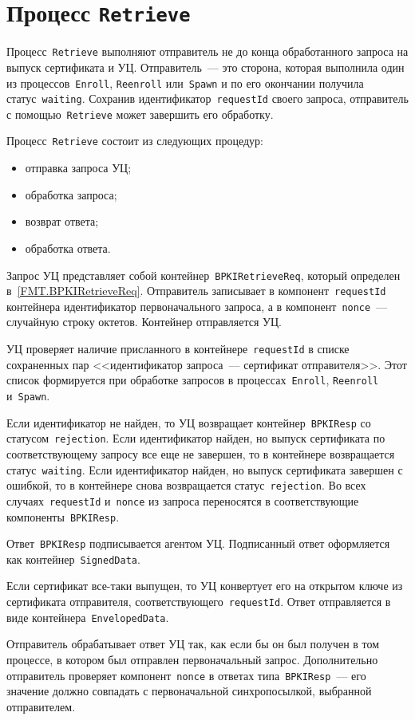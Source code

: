 \section{Процесс \texttt{Retrieve}}\label{PROCESSES.Retrieve}

Процесс~\texttt{Retrieve} выполняют отправитель не до конца обработанного
запроса на выпуск сертификата и УЦ.  Отправитель~--- это сторона, которая 
выполнила один из процессов~\texttt{Enroll}, \texttt{Reenroll} 
или~\texttt{Spawn} и по его окончании получила статус~\texttt{waiting}. 
Сохранив идентификатор~\texttt{requestId} своего запроса, отправитель с 
помощью~\texttt{Retrieve} может завершить его обработку.

Процесс~\texttt{Retrieve} состоит из следующих процедур:
\begin{itemize}
\item
отправка запроса УЦ;
\item
обработка запроса;
\item
возврат ответа;
\item
обработка ответа.
\end{itemize}

Запрос УЦ представляет собой контейнер~\texttt{BPKIRetrieveReq},
который определен в~\ref{FMT.BPKIRetrieveReq}.
Отправитель записывает в компонент~\texttt{requestId} контейнера
идентификатор первоначального запроса, а в компонент~\texttt{nonce}~---
случайную строку октетов. Контейнер отправляется УЦ.

УЦ проверяет наличие присланного в контейнере~\texttt{requestId} в списке 
сохраненных пар <<идентификатор запроса~--- сертификат отправителя>>. Этот 
список формируется при обработке запросов в процессах~\texttt{Enroll}, 
\texttt{Reenroll} и~\texttt{Spawn}. 

Если идентификатор не найден, то УЦ возвращает контейнер~\texttt{BPKIResp}
со статусом~\texttt{rejection}. 
%
Если идентификатор найден, но выпуск сертификата по соответствующему 
запросу все еще не завершен, то в контейнере возвращается 
статус~\texttt{waiting}.  
%
Если идентификатор найден, но выпуск сертификата завершен с ошибкой,
то в контейнере снова возвращается статус~\texttt{rejection}. 
%
Во всех случаях~\texttt{requestId} и~\texttt{nonce} из запроса переносятся 
в соответствующие компоненты~\texttt{BPKIResp}. 

Ответ~\texttt{BPKIResp} подписывается агентом УЦ. 
Подписанный ответ оформляется как контейнер~\texttt{SignedData}.

Если сертификат все-таки выпущен, то УЦ конвертует его 
на открытом ключе из сертификата отправителя, 
соответствующего~\texttt{requestId}. Ответ отправляется
в виде контейнера~\texttt{EnvelopedData}.

Отправитель обрабатывает ответ УЦ так, как если бы он был получен в 
том процессе, в котором был отправлен первоначальный запрос.
Дополнительно отправитель проверяет компонент~\texttt{nonce}
в ответах типа~\texttt{BPKIResp}~--- его значение должно совпадать 
с первоначальной синхропосылкой, выбранной отправителем.

